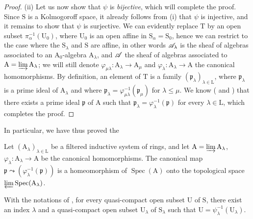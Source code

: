 \begin{proof}
\medskip
\noindent
(ii) Let us now show that $\psi$ is \emph{bijective}, which will complete the proof.
Since $\mathrm{S}$ is a Kolmogoroff space, it already follows from (i) that $\psi$ is injective, and it remains to show that $\psi$ is surjective.
We can evidently replace $\mathrm{T}$ by an open subset $\pi_\alpha^{-1}(\mathrm{U}_0)$, where $\mathrm{U}_0$ is an open affine in $\mathrm{S}_\alpha=\mathrm{S}_0$, hence we can restrict to the case where the $\mathrm{S}_\lambda$ and $\mathrm{S}$ are affine, in other words $\mathscr{A}_\lambda$ is the sheaf of algebras associated to an $\mathrm{A}_0$-algebra $\mathrm{A}_\lambda$, and $\mathscr{A}$ the sheaf of algebras associated to $\mathrm{A}=\varinjlim\mathrm{A}_\lambda$; we will still denote $\varphi_{\mu\lambda}:\mathrm{A}_\lambda\to\mathrm{A}_\mu$ and $\varphi_\lambda:\mathrm{A}_\lambda\to\mathrm{A}$ the canonical homomorphisms.
By definition, an element of $\mathrm{T}$ is a family $(\mathfrak{p}_\lambda)_{\lambda\in\mathrm{L}}$, where $\mathfrak{p}_\lambda$ is a prime ideal of $\mathrm{A}_\lambda$ and where $\mathfrak{p}_\lambda=\varphi_{\mu\lambda}^{-1}(\mathfrak{p}_\mu)$ for $\lambda\leqslant\mu$.
We know ( and ) that there exists a prime ideal $\mathfrak{p}$ of $\mathrm{A}$ such that $\mathfrak{p}_\lambda=\varphi_\lambda^{-1}(\mathfrak{p})$ for every $\lambda\in\mathrm{L}$, which completes the proof.
\end{proof}

In particular, we have thus proved the

\begin{corollary}[8.2.10]
\label{IV.8.2.10}
Let $(\mathrm{A}_\lambda)_{\lambda\in\mathrm{L}}$ be a filtered inductive system of rings, and let $\mathrm{A}=\varinjlim\mathrm{A}_\lambda$, $\varphi_\lambda:\mathrm{A}_\lambda\to\mathrm{A}$ be the canonical homomorphisms.
The canonical map $\mathfrak{p}\leadsto(\varphi_\lambda^{-1}(\mathfrak{p}))$ is a homeomorphism of $\operatorname{Spec}(\mathrm{A})$ onto the topological space $\varprojlim\operatorname{Spec}(\mathrm{A}_\lambda)$.
\end{corollary}

\begin{corollary}[8.2.11]
\label{IV.8.2.11}
With the notations of , for every quasi-compact open subset $\mathrm{U}$ of $\mathrm{S}$, there exist an index $\lambda$ and a quasi-compact open subset $\mathrm{U}_\lambda$ of $\mathrm{S}_\lambda$ such that $\mathrm{U}=\psi_\lambda^{-1}(\mathrm{U}_\lambda)$.
\end{corollary}

